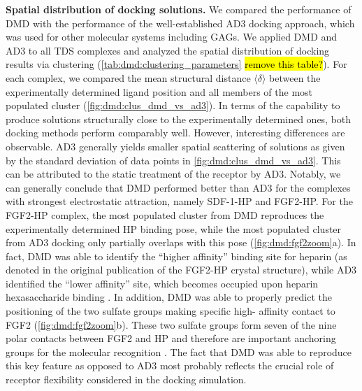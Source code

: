 \vspace{1cm}
\textbf{Spatial distribution of docking solutions.}
We compared the performance of DMD with the performance of the well-established
AD3 docking approach, which was used for other molecular systems including GAGs.
We applied DMD and AD3 to all TDS complexes and analyzed the spatial
distribution of docking results via clustering
(\cref{tab:dmd:clustering_parameters} \hl{remove this table?}). For each
complex, we compared the mean structural distance $\langle \delta \rangle$
between the experimentally determined ligand position and all members of the
most populated cluster (\cref{fig:dmd:clus_dmd_vs_ad3}). In terms of the
capability to produce solutions structurally close to the experimentally
determined ones, both docking methods perform comparably well. However,
interesting differences are observable. AD3 generally yields smaller spatial
scattering of solutions as given by the standard deviation of data points in
\cref{fig:dmd:clus_dmd_vs_ad3}. This can be attributed to the static treatment
of the receptor by AD3. Notably, we can generally conclude that DMD performed
better than AD3 for the complexes with strongest electrostatic attraction,
namely SDF-1-HP and FGF2-HP. For the FGF2-HP complex, the most populated cluster
from DMD reproduces the experimentally determined HP binding pose, while the
most populated cluster from AD3 docking only partially overlaps with this pose
(\cref{fig:dmd:fgf2zoom}a). In fact, DMD was able to identify the
\enquote{higher affinity} binding site for heparin (as denoted in the original
publication of the FGF2-HP crystal structure), while AD3 identified the
\enquote{lower affinity} site, which becomes occupied upon heparin
hexasaccharide binding \cite{faham_heparin_1996}. In addition, DMD was able to
properly predict the positioning of the two sulfate groups making specific high-
affinity contact to FGF2 (\cref{fig:dmd:fgf2zoom}b). These two sulfate groups
form seven of the nine polar contacts between FGF2 and HP and therefore are
important anchoring groups for the molecular recognition
\cite{faham_heparin_1996}. The fact that DMD was able to reproduce this key
feature as opposed to AD3 most probably reflects the crucial role of receptor
flexibility considered in the docking simulation.


